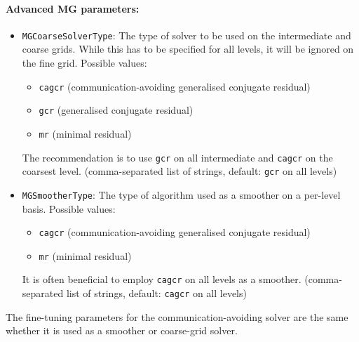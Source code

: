 \paragraph{Advanced MG parameters:}
\begin{itemize}
  \item{ \texttt{MGCoarseSolverType}: The type of solver to be used on the intermediate and coarse grids. While this has to be specified for all levels, it will be ignored on the fine grid. Possible values:
    \begin{itemize}
      \item \texttt{cagcr} (communication-avoiding generalised conjugate residual)
      \item \texttt{gcr} (generalised conjugate residual)
      \item \texttt{mr} (minimal residual)
    \end{itemize}
    The recommendation is to use \texttt{gcr} on all intermediate and \texttt{cagcr} on the coarsest level.
    (comma-separated list of strings, default: \texttt{gcr} on all levels)}
  \item{ \texttt{MGSmootherType}: The type of algorithm used as a smoother on a per-level basis. Possible values:
    \begin{itemize}
      \item \texttt{cagcr} (communication-avoiding generalised conjugate residual)
      \item \texttt{mr} (minimal residual)
    \end{itemize}
    It is often beneficial to employ \texttt{cagcr} on all levels as a smoother.
    (comma-separated list of strings, default: \texttt{cagcr} on all levels)}
\end{itemize}
The fine-tuning parameters for the communication-avoiding solver are the same whether it is used as a smoother or coarse-grid solver.
